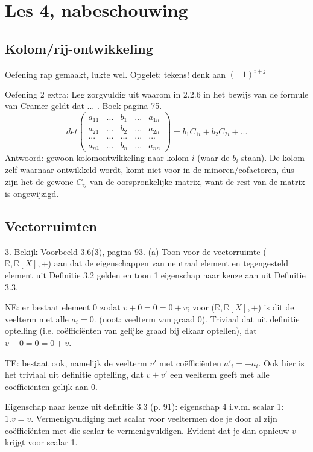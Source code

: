 \documentclass{article}
\begin{document}
\section{Les 4, nabeschouwing}

\subsection {Kolom/rij-ontwikkeling}

Oefening rap gemaakt, lukte wel. Opgelet: tekens! denk aan $(-1)^{i+j}$

Oefening 2 extra:  Leg zorgvuldig uit waarom in 2.2.6 in het bewijs van de formule van Cramer geldt
dat ... . Boek pagina 75. 
\[ 
det \begin{pmatrix}
a_{11} & ... & b_1 & ... & a_{1n} \\ 
a_{21} & ... & b_2 & ... & a_{2n} \\
...    & ... & ... & ... & ... \\ 
a_{n1} & ... & b_n & ... & a_{nn} 
\end{pmatrix} 
= b_1 C_{1i} + b_2 C_{2i} + ... 
\] 
Antwoord: gewoon kolomontwikkeling naar kolom $i$ (waar de $b_i$ staan). De kolom zelf waarnaar ontwikkeld wordt, komt niet voor in de minoren/cofactoren, dus zijn het de gewone $C_{ij}$ van de oorspronkelijke matrix, want de rest van de matrix is ongewijzigd. 


\subsection {Vectorruimten}

3. Bekijk Voorbeeld 3.6(3), pagina 93. 
(a) Toon voor de vectorruimte ($\mathbb{R}, \mathbb{R}[X], +$) aan dat de eigenschappen van neutraal element en tegengesteld element uit Definitie 3.2 gelden en toon 1 eigenschap naar keuze aan uit Definitie 3.3.

NE: er bestaat element 0 zodat $v+0=0=0+v$; voor ($\mathbb{R}, \mathbb{R}[X], +$) is dit de veelterm met alle  $a_i=0$. (noot: veelterm van graad 0). Triviaal dat uit definitie optelling (i.e. co\"effici\"enten van gelijke graad bij elkaar optellen), dat $v+0 = 0 = 0+v$. 

TE: bestaat ook, namelijk de veelterm $v'$ met co\"effici\"enten $a'_i = -a_i$. Ook hier is het triviaal uit definitie optelling, dat $v + v'$ een veelterm geeft met alle co\"effici\"enten gelijk aan $0$. 

Eigenschap naar keuze uit definitie 3.3 (p. 91): eigenschap 4 i.v.m. scalar 1: $1 . v=v$. Vermenigvuldiging met scalar voor veeltermen doe je door al zijn co\"effici\"enten met die scalar te vermenigvuldigen. Evident dat je dan opnieuw $v$ krijgt voor scalar 1. 
\end{document}

